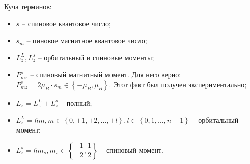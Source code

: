 Куча терминов:
\begin{itemize}
  \item $s$ -- спиновое квантовое число;
  \item $s_m$ -- пиновое магнитное квантовое число;
  \item $L_z^L, L_z^s$ -- орбитальный и спиновые моменты;
  \item $P_{mz}^s$ -- спиновый магнитный момент.
    Для него верно: $P_{mz}^s = 2 \mu_B \cdot s_m \in \left\{ -\mu_B, \mu_B \right\}$.
    Этот факт был получен экспериментально;
  \item $L_z = L_z^L + L_z^s$ -- полный;
  \item $L_z^L = \hbar m, m \in \left\{ 0, \pm 1, \pm 2, \dots, \pm l \right\}, l \in \left\{ 0, 1, \dots, n-1 \right\}$ -- орбитальный момент;
  \item $L_z^s = \hbar m_s, m_s \in \left\{ - \dfrac{1}{2}, \dfrac{1}{2} \right\}$ -- спиновый момент.
\end{itemize}
